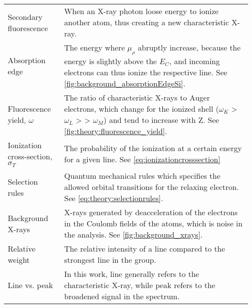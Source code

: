 \begin{table}[phb]
\begin{center}
\begin{tabular}{p{3cm}p{11.6cm}}
            Secondary fluorescence               & When an X-ray photon loose energy to ionize another atom, thus creating a new characteristic X-ray.                                                                                                         \\
            Absorption edge                      & The energy where $\mu_\rho$ abruptly increase, because the energy is slightly above the $E_C$, and incoming electrons can thus ionize the respective line.  See \cref{fig:background_absorptionEdgeSi}.     \\
            Fluorescence yield, $\omega$         & The ratio of characteristic X-rays to Auger electrons, which change for the ionized shell ($\omega_K$ > $\omega_L$ > > $\omega_M$) and tend to increase with Z.  See  \cref{fig:theory:fluorescence_yield}. \\
            Ionization cross-section, $\sigma_T$ & The probability of the ionization at a certain energy for a given line. See \cref{eq:ionizationcrosssection}                                                                                                \\
            Selection rules                      & Quantum mechanical rules which specifies the allowed orbital transitions for the relaxing electron. See \cref{eq:theory:selectionrules}.                                                                    \\
            Background X-rays                    & X-rays generated by deacceleration of the electrons in the Coulomb fields of the atoms, which is noise in the analysis. See \cref{fig:background_xrays}.                                                    \\
            Relative weight                      & The relative intensity of a line compared to the strongest line in the group.                                                                                                                               \\
            Line vs. peak                        & In this work, line generally refers to the characteristic X-ray, while peak refers to the broadened signal in the spectrum.                                                                                 \\
            \hline
        \end{tabular}
    \end{center}
\end{table}